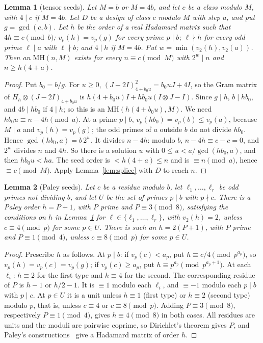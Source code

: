\documentclass[10pt]{article}
\newtheorem{lemma}{Lemma}
\theoremstyle{remark}
\newcommand{\MH}{\mathrm{MH}}
\begin{document}
\begin{lemma}[tensor seeds]\label{lem:seed}
Let $M=b$ or $M=4b$, and let $c$ be a class modulo $M$, with $4\mid c$ if $M=4b$. Let $D$ be a design of class $c$ modulo $M$ with step $a$, and put $g=\gcd(c,b)$. Let $h$ be the order of a real Hadamard matrix such that $4h\equiv c\pmod b$; $v_p(h)=v_p(g)$ for every prime $p\mid b$; $\ell\nmid h$ for every odd prime $\ell\mid a$ with $\ell\nmid b$; and $4\mid h$ if $M=4b$. Put $w=\min(v_2(h),v_2(a))$. Then an $\MH(n,M)$ exists for every $n\equiv c\pmod M$ with $2^w\mid n$ and $n\ge h(4+a)$.
\end{lemma}

\begin{proof}
Put $b_0=b/g$. For $u\ge0$, $(J-2I)_{4+b_0u}^2=b_0uJ+4I$, so the Gram matrix of $H_h\otimes(J-2I)_{4+b_0u}$ is $h(4+b_0u)I+hb_0u(I\otimes J-I)$. Since $g\mid h$, $b\mid hb_0$, and $4b\mid hb_0$ if $4\mid h$; so this is an $\MH(h(4+b_0u),M)$. We need $hb_0u\equiv n-4h\pmod a$. At a prime $p\mid b$, $v_p(hb_0)=v_p(b)\le v_p(a)$, because $M\mid a$ and $v_p(h)=v_p(g)$; the odd primes of $a$ outside $b$ do not divide $hb_0$. Hence $\gcd(hb_0,a)=b\,2^w$. It divides $n-4h$: modulo $b$, $n-4h\equiv c-c=0$, and $2^w$ divides $n$ and $4h$. So there is a solution $u$ with $0\le u<a/\gcd(hb_0,a)$, and then $hb_0u<ha$. The seed order is $<h(4+a)\le n$ and is $\equiv n\pmod a$, hence $\equiv c\pmod M$. Apply Lemma~\ref{lem:splice} with $D$ to reach $n$.
\end{proof}

\begin{lemma}[Paley seeds]\label{lem:paley}
Let $c$ be a residue modulo $b$, let $\ell_1,\dots,\ell_r$ be odd primes not dividing $b$, and let $U$ be the set of primes $p\mid b$ with $p\nmid c$. There is a Paley order $h=P+1$, with $P$ prime and $P\equiv3\pmod8$, satisfying the conditions on $h$ in Lemma~\ref{lem:seed} for $\ell\in\{\ell_1,\dots,\ell_r\}$, with $v_2(h)=2$, unless $c\equiv4\pmod p$ for some $p\in U$. There is such an $h=2(P+1)$, with $P$ prime and $P\equiv1\pmod4$, unless $c\equiv8\pmod p$ for some $p\in U$.
\end{lemma}

\begin{proof}
Prescribe $h$ as follows. At $p\mid b$: if $v_p(c)<a_p$, put $h\equiv c/4\pmod{p^{a_p}}$, so $v_p(h)=v_p(c)=v_p(g)$; if $v_p(c)\ge a_p$, put $h\equiv p^{a_p}\pmod{p^{a_p+1}}$. At each $\ell_i$: $h\equiv2$ for the first type and $h\equiv4$ for the second. The corresponding residue of $P$ is $h-1$ or $h/2-1$. It is $\equiv1$ modulo each $\ell_i$, and $\equiv-1$ modulo each $p\mid b$ with $p\mid c$. At $p\in U$ it is a unit unless $h\equiv1$ (first type) or $h\equiv2$ (second type) modulo $p$, that is, unless $c\equiv4$ or $c\equiv8\pmod p$. Adding $P\equiv3\pmod8$, respectively $P\equiv1\pmod4$, gives $h\equiv4\pmod8$ in both cases. All residues are units and the moduli are pairwise coprime, so Dirichlet's theorem gives $P$, and Paley's constructions~\cite{Pa33} give a Hadamard matrix of order $h$.
\end{proof}
\end{document}
